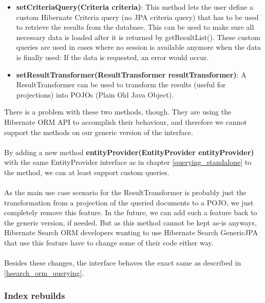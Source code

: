 \begin{itemize}
	\item \textbf{setCriteriaQuery(Criteria criteria)}:
		This method lets the user define a custom Hibernate Criteria query (no JPA criteria query) that has to be used to retrieve the results from the database. This can be used to make sure all necessary data is loaded after it is returned by getResultList(). These custom queries are  used in cases where no session is available anymore when the data is finally used: If the data is requested, an error would occur.
	\item \textbf{setResultTransformer(ResultTransformer resultTransformer)}:
		A ResultTransformer can be used to transform the results (useful for projections) into POJOs (Plain Old Java Object).
\end{itemize}
\noindent
There is a problem with these two methods, though. They are using the Hibernate ORM API to accomplish their behaviour, and therefore we cannot support the methods on our generic version of the interface.
\\\\
By adding a new method \textbf{entityProvider(EntityProvider entityProvider)} with the same EntityProvider interface as in chapter \ref{querying_standalone} to the method, we can at least support custom queries.
\\\\
As the main use case scenario for the ResultTransformer is probably just the transformation from a projection of the queried documents to a POJO, we just completely remove this feature. In the future, we can add such a feature back to the generic version, if needed. But as this method cannot be kept as-is anyways, Hibernate Search ORM developers wanting to use Hibernate Search GenericJPA that use this feature have to change some of their code either way.
\\\\
Besides these changes, the interface behaves the exact same as described in \ref{hsearch_orm_querying}.

\pagebreak

\subsubsection{Index rebuilds}

